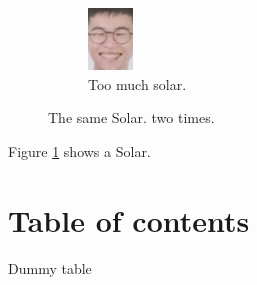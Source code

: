 \documentclass{article}
\begin{document}
\begin{figure}[ht!]
\begin{subfigure}[b]{0.5\linewidth}
\includegraphics[width=\linewidth]{images/solar.png}
\caption{Too much solar.}
\end{subfigure}

\caption{The same Solar. two times.}
\label{fig:solar1}
\end{figure}

Figure \ref{fig:solar1} shows a Solar.

\section{Table of contents}
\begin{table}
\caption{Dummy table}
\end{table}

\begin{appendix}
\listoffigures
\listoftables
\end{appendix}
\end{document}
